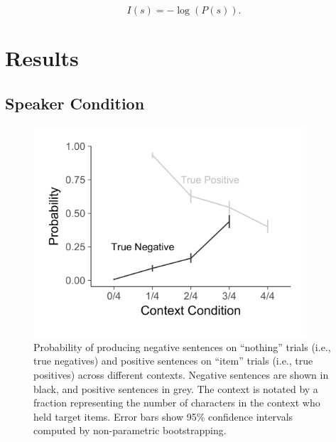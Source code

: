 \documentclass[man, floatsintext, noapacite]{apa6}
\begin{document}
\begin{equation}
\label{eq:surprise}
I(s) = -\log(P(s)).
\end{equation}

\section{Results}

\subsection{Speaker Condition}

\begin{figure}[t]
\begin{center} 
\includegraphics[width=4in]{figures/probs2.pdf}
\caption{\label{fig:speakerprobs} Probability of producing negative sentences on ``nothing'' trials (i.e., true negatives) and positive sentences on ``item'' trials (i.e., true positives) across different contexts. Negative sentences are shown in black, and positive sentences in grey.  The context is notated by a fraction representing the number of characters in the context who held target items. Error bars show 95\% confidence intervals computed by non-parametric bootstrapping.  }
\end{center} 
\end{figure}
\end{document}
